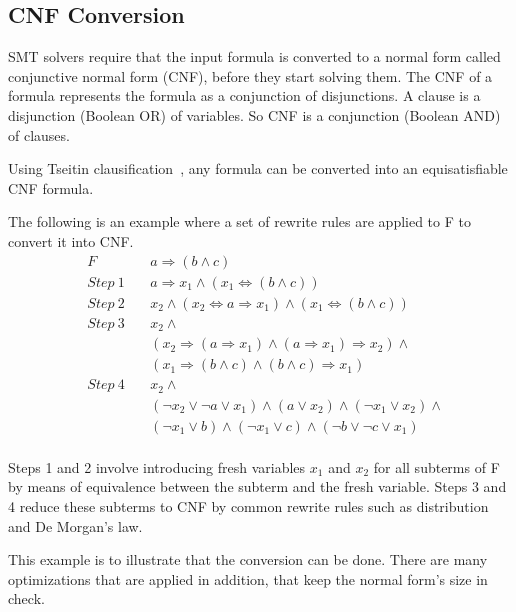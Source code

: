\documentclass{article}
\begin{document}
\subsection{CNF Conversion}
\label{sec:cnf}
\begin{framed}
SMT solvers require that the input formula is converted to a 
normal form called conjunctive normal form (CNF), before they 
start solving them. The CNF of a formula represents the 
formula as a conjunction of disjunctions. A clause is a 
disjunction (Boolean OR) of variables. So CNF is a 
conjunction (Boolean AND) of clauses. 
\end{framed}

Using Tseitin clausification~\cite{BEL01Handbook}, any formula 
can be converted into an equisatisfiable CNF formula.

The following is an example where a set of rewrite rules
are applied to F to convert it into CNF. 
\begin{align*}
	&F&\ &a \Rightarrow (b \land c) \\
	&Step\ 1&\ &a \Rightarrow x_1 
		\land (x_1 \iff (b \land c)) \\
	&Step\ 2&\ &x_2 \land (x_2 \iff a \Rightarrow x_1) 
		\land (x_1 \iff (b \land c)) \\
	&Step\ 3&\ &x_2 \land \\
	& & &(x_2 \Rightarrow (a \Rightarrow x_1) \land 
		(a \Rightarrow x_1) \Rightarrow x_2) \land \\
	& & &(x_1 \Rightarrow (b \land c) \land 
		(b \land c) \Rightarrow x_1) \\
	&Step\ 4&\ &x_2 \land \\
	& & &(\neg x_2 \lor \neg a \lor x_1) \land 
		(a \lor x_2) \land (\neg x_1 \lor x_2) \land \\
	& & &(\neg x_1 \lor b) \land (\neg x_1 \lor c) \land 
		(\neg b \lor \neg c \lor x_1) \\
\end{align*}

Steps 1 and 2 involve introducing fresh variables $x_1$
and $x_2$ for all subterms of F by means of equivalence 
between the subterm and the fresh variable. Steps 3 and 4 
reduce these subterms to CNF by common rewrite rules 
such as distribution and De Morgan's law.

This example is to illustrate that the conversion can be done.
There are many optimizations that are applied in addition, 
that keep the normal form's size in check.
\end{document}
